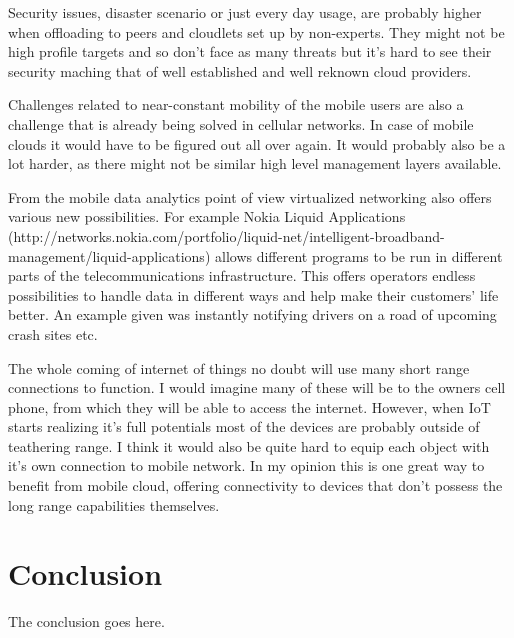 \documentclass[conference]{IEEEtran}
\begin{document}
\par
Security issues, disaster scenario or just every day usage, are probably higher when offloading to peers and cloudlets set up by non-experts. They might not be high profile targets and so don't face as many threats but it's hard to see their security maching that of well established and well reknown cloud providers.
\par
Challenges related to near-constant mobility of the mobile users are also a challenge that is already being solved in cellular networks. In case of mobile clouds it would have to be figured out all over again. It would probably also be a lot harder, as there might not be similar high level management layers available.
\par
From the mobile data analytics point of view virtualized networking also offers various new possibilities. For example Nokia Liquid Applications (http://networks.nokia.com/portfolio/liquid-net/intelligent-broadband-management/liquid-applications) allows different programs to be run in different parts of the telecommunications infrastructure. This offers operators endless possibilities to handle data in different ways and help make their customers' life better. An example given was instantly notifying drivers on a road of upcoming crash sites etc.
\par
The whole coming of internet of things no doubt will use many short range connections to function. I would imagine many of these will be to the owners cell phone, from which they will be able to access the internet. However, when IoT starts realizing it's full potentials most of the devices are probably outside of teathering range. I think it would also be quite hard to equip each object with it's own connection to mobile network. In my opinion this is one great way to benefit from mobile cloud, offering connectivity to devices that don't possess the long range capabilities themselves.

\section{Conclusion}
The conclusion goes here.
\end{document}
